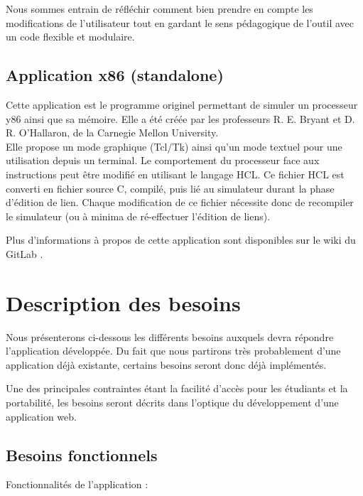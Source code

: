 \documentclass[french]{article}
\begin{document}
Nous sommes entrain de réfléchir comment bien prendre en compte les modifications de l'utilisateur tout en gardant le sens pédagogique de l'outil avec un code flexible et modulaire.

\subsection{Application x86 (standalone)}

Cette application est le programme originel permettant de simuler un processeur y86 ainsi que sa mémoire. Elle a été créée par les professeurs R. E. Bryant et D. R. O'Hallaron, de la Carnegie Mellon University. \\
Elle propose un mode graphique (Tcl/Tk) ainsi qu'un mode textuel pour une utilisation depuis un terminal. Le comportement du processeur face aux instructions peut être modifié en utilisant le langage HCL. Ce fichier HCL est converti en fichier source C, compilé, puis lié au simulateur durant la phase d'édition de lien. Chaque modification de ce fichier nécessite donc de recompiler le simulateur (ou à minima de ré-effectuer l'édition de liens).

Plus d'informations à propos de cette application sont disponibles sur le wiki du GitLab \cite{wiki-application-y86}.

\section{Description des besoins}

Nous présenterons ci-dessous les différents besoins auxquels devra répondre l'application développée. Du fait que nous partirons très probablement d'une application déjà existante, certains besoins seront donc déjà implémentés.

Une des principales contraintes étant la facilité d'accès pour les étudiants et la portabilité, les besoins seront décrits dans l'optique du développement d'une application web.

\newpage
\subsection{Besoins fonctionnels}
Fonctionnalités de l'application :
\end{document}
